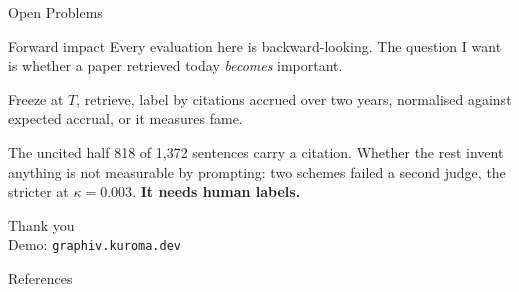 \documentclass[aspectratio=169, 11pt]{beamer}
\let\oldtextbf\textbf
\renewcommand{\textbf}[1]{{\color{ktertiary}\oldtextbf{#1}}}
\let\oldemph\emph
\renewcommand{\emph}[1]{{\color{ksecondary}\oldemph{#1}}}
\begin{document}
\begin{frame}{Open Problems}
  \begin{kbox}{Forward impact}
    Every evaluation here is backward-looking. The question I want is whether a paper
    retrieved today \emph{becomes} important.

    Freeze at $T$, retrieve, label by citations accrued over two years, normalised against
    expected accrual, or it measures fame.
  \end{kbox}
  \begin{kbox}{The uncited half}
    818 of 1,372 sentences carry a citation. Whether the rest invent anything is not
    measurable by prompting: two schemes failed a second judge, the stricter at
    $\kappa = 0.003$. \textbf{It needs human labels.}
  \end{kbox}
\end{frame}

\begin{frame}
  \begin{center}
    {\Huge Thank you}\\[1.2em]
    {\large Demo: \texttt{graphiv.kuroma.dev}}\\[0.6em]
  \end{center}
\end{frame}

\begin{frame}[allowframebreaks]{References}
  
  
\end{frame}
\end{document}
